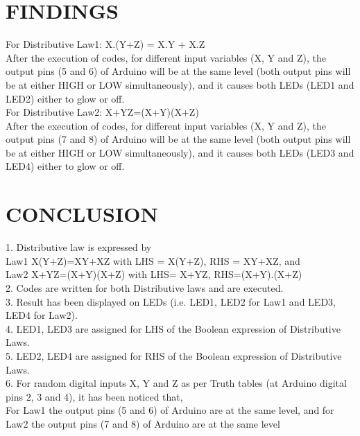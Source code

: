 \documentclass[conference]{IEEEtran}
\begin{document}
\section{FINDINGS}
\begin{flushleft}
For Distributive Law1: X.(Y+Z) = X.Y + X.Z \\
After the execution of codes, for different input variables (X, Y and Z), the output pins (5 and 6) of Arduino will be at the same level (both output pins will be at either HIGH or LOW simultaneously), and it causes both LEDs (LED1 and LED2) either to glow or off.\\
For Distributive Law2: X+YZ=(X+Y)(X+Z) \\
After the execution of codes, for different input variables (X, Y and Z), the output pins (7 and 8) of Arduino will be at the same level (both output pins will be at either HIGH or LOW simultaneously), and it causes both LEDs (LED3 and LED4) either to glow or off.\\
\end{flushleft}
\section{CONCLUSION}
\begin{flushleft}
1. Distributive law is expressed by \\
Law1 X(Y+Z)=XY+XZ with LHS = X(Y+Z), RHS = XY+XZ, and \\
Law2 X+YZ=(X+Y)(X+Z) with LHS= X+YZ, RHS=(X+Y).(X+Z)\\
2. Codes are written for both Distributive laws and are executed.\\
3. Result has been displayed on LEDs (i.e. LED1, LED2 for Law1 and LED3, LED4 for Law2). \\
4. LED1, LED3 are assigned for LHS of the Boolean expression of Distributive Laws. \\
5. LED2, LED4 are assigned for RHS of the Boolean expression of Distributive Laws. \\
6. For random digital inputs X, Y and Z as per Truth tables (at Arduino digital pins 2, 3 and 4), it has been noticed that, \\
For Law1 the output pins (5 and 6) of Arduino are at the same level, and for Law2 the output pins (7 and 8) of Arduino are at the same level
\end{flushleft}
\end{document}
